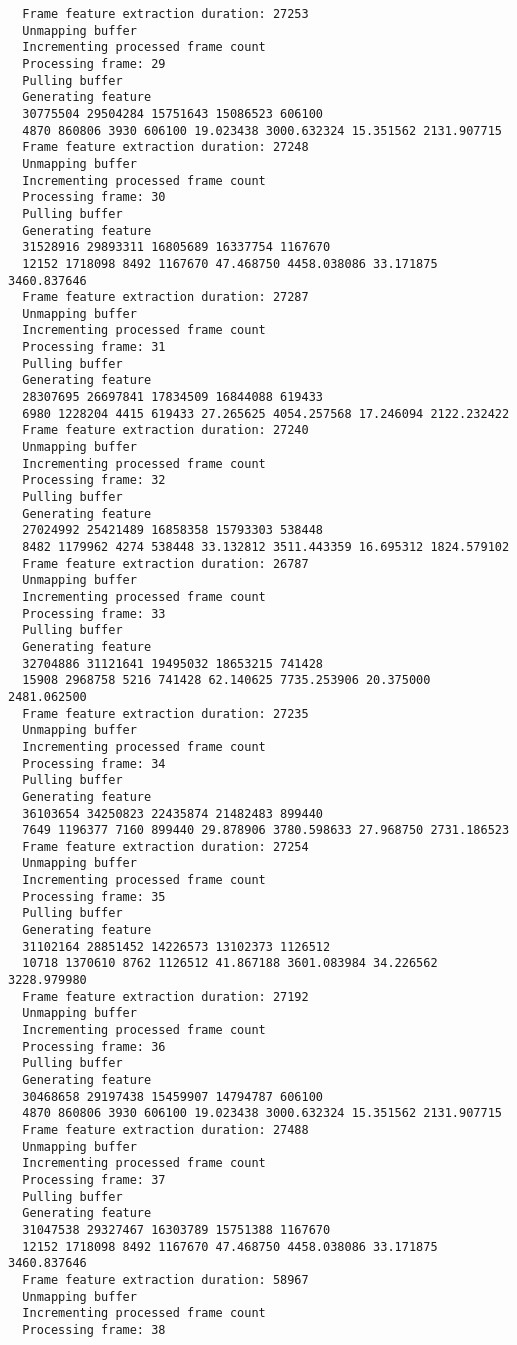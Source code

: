 \documentclass[12pt,oneside]{book}
\begin{document}
\begin{lstlisting}
  Frame feature extraction duration: 27253
  Unmapping buffer
  Incrementing processed frame count
  Processing frame: 29
  Pulling buffer
  Generating feature
  30775504 29504284 15751643 15086523 606100
  4870 860806 3930 606100 19.023438 3000.632324 15.351562 2131.907715
  Frame feature extraction duration: 27248
  Unmapping buffer
  Incrementing processed frame count
  Processing frame: 30
  Pulling buffer
  Generating feature
  31528916 29893311 16805689 16337754 1167670
  12152 1718098 8492 1167670 47.468750 4458.038086 33.171875 3460.837646
  Frame feature extraction duration: 27287
  Unmapping buffer
  Incrementing processed frame count
  Processing frame: 31
  Pulling buffer
  Generating feature
  28307695 26697841 17834509 16844088 619433
  6980 1228204 4415 619433 27.265625 4054.257568 17.246094 2122.232422
  Frame feature extraction duration: 27240
  Unmapping buffer
  Incrementing processed frame count
  Processing frame: 32
  Pulling buffer
  Generating feature
  27024992 25421489 16858358 15793303 538448
  8482 1179962 4274 538448 33.132812 3511.443359 16.695312 1824.579102
  Frame feature extraction duration: 26787
  Unmapping buffer
  Incrementing processed frame count
  Processing frame: 33
  Pulling buffer
  Generating feature
  32704886 31121641 19495032 18653215 741428
  15908 2968758 5216 741428 62.140625 7735.253906 20.375000 2481.062500
  Frame feature extraction duration: 27235
  Unmapping buffer
  Incrementing processed frame count
  Processing frame: 34
  Pulling buffer
  Generating feature
  36103654 34250823 22435874 21482483 899440
  7649 1196377 7160 899440 29.878906 3780.598633 27.968750 2731.186523
  Frame feature extraction duration: 27254
  Unmapping buffer
  Incrementing processed frame count
  Processing frame: 35
  Pulling buffer
  Generating feature
  31102164 28851452 14226573 13102373 1126512
  10718 1370610 8762 1126512 41.867188 3601.083984 34.226562 3228.979980
  Frame feature extraction duration: 27192
  Unmapping buffer
  Incrementing processed frame count
  Processing frame: 36
  Pulling buffer
  Generating feature
  30468658 29197438 15459907 14794787 606100
  4870 860806 3930 606100 19.023438 3000.632324 15.351562 2131.907715
  Frame feature extraction duration: 27488
  Unmapping buffer
  Incrementing processed frame count
  Processing frame: 37
  Pulling buffer
  Generating feature
  31047538 29327467 16303789 15751388 1167670
  12152 1718098 8492 1167670 47.468750 4458.038086 33.171875 3460.837646
  Frame feature extraction duration: 58967
  Unmapping buffer
  Incrementing processed frame count
  Processing frame: 38

\end{lstlisting}
\end{document}
